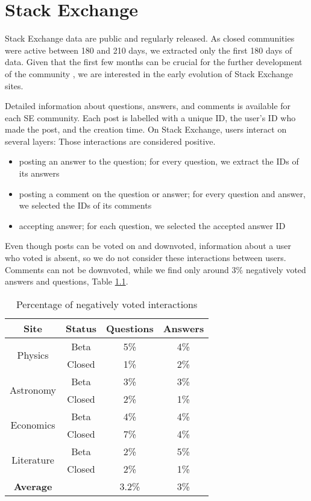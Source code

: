 \chapter{Stack Exchange}
\label{App:SE}
Stack Exchange data are public and regularly released. As closed communities were active between 180 and 210 days, we extracted only the first 180 days of data. Given that the first few months can be crucial for the further development of the community \cite{dover2020sustainable}, we are interested in the early evolution of Stack Exchange sites. 

Detailed information about questions, answers, and comments is available for each SE community. Each post is labelled with a unique ID, the user's ID who made the post, and the creation time. On Stack Exchange, users interact on several layers: Those interactions are considered positive.
\begin{itemize}
	\item posting an answer to the question; for every question, we extract the IDs of its answers
	\item posting a comment on the question or answer; for every question and answer, we selected the IDs of its comments
	\item accepting answer; for each question, we selected the accepted answer ID
\end{itemize}

Even though posts can be voted on and downvoted, information about a user who voted is absent, so we do not consider these interactions between users. Comments can not be downvoted, while we find only around 3\% negatively voted answers and questions, Table \ref{tab:negint}.

\begin{table}[hbt!]
	\centering
	\caption{Percentage of negatively voted interactions}
	\label{tab:negint}
	\begin{tabular}{cc|cc}
		
		\hline
		Site                        & Status & Questions & Answers \\ \hline
		\multirow{2}{*}{Physics}    & Beta   & 5\%       & 4\%     \\
		& Closed & 1\%       & 2\%     \\ \hline
		\multirow{2}{*}{Astronomy}  & Beta   & 3\%       & 3\%     \\
		& Closed & 2\%       & 1\%     \\ \hline
		\multirow{2}{*}{Economics}  & Beta   & 4\%       & 4\%     \\
		& Closed & 7\%       & 4\%     \\ \hline
		\multirow{2}{*}{Literature} & Beta   & 2\%       & 5\%     \\ 
		& Closed & 2\%       & 1\%     \\ \hline \hline
		\textbf{Average}            &        & 3.2\%     & 3\%     \\ \hline 
	\end{tabular}
\end{table}


